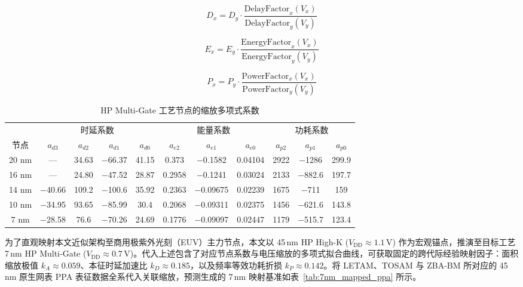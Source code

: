 \documentclass[12pt,a4paper,UTF8]{article}
\begin{document}
\begin{equation}
D_x = D_y \cdot \frac{\mathrm{DelayFactor}_x(V_x)}{\mathrm{DelayFactor}_y(V_y)}
\label{eq:delay_scale}
\end{equation}

\begin{equation}
E_x = E_y \cdot \frac{\mathrm{EnergyFactor}_x(V_x)}{\mathrm{EnergyFactor}_y(V_y)}
\label{eq:energy_scale}
\end{equation}

\begin{equation}
P_x = P_y \cdot \frac{\mathrm{PowerFactor}_x(V_x)}{\mathrm{PowerFactor}_y(V_y)}
\label{eq:power_scale}
\end{equation}

\begin{table}[H]
\footnotesize
\centering
\caption{HP Multi-Gate 工艺节点的缩放多项式系数\cite{stillmaker2017scaling}}
\label{tab:scaling_coeffs}
\begin{tabular}{c|cccc|ccc|ccc}
\toprule
 & \multicolumn{4}{c|}{时延系数} & \multicolumn{3}{c|}{能量系数} & \multicolumn{3}{c}{功耗系数} \\
节点 & \(a_{d3}\) & \(a_{d2}\) & \(a_{d1}\) & \(a_{d0}\) & \(a_{e2}\) & \(a_{e1}\) & \(a_{e0}\) & \(a_{p2}\) & \(a_{p1}\) & \(a_{p0}\) \\
\midrule
20 nm & --- & 34.63 & $-$66.37 & 41.15 & 0.373 & $-$0.1582 & 0.04104 & 2922 & $-$1286 & 299.9 \\
16 nm & --- & 24.80 & $-$47.52 & 28.87 & 0.2958 & $-$0.1241 & 0.03024 & 2133 & $-$882.6 & 197.7 \\
14 nm & $-$40.66 & 109.2 & $-$100.6 & 35.92 & 0.2363 & $-$0.09675 & 0.02239 & 1675 & $-$711 & 159 \\
10 nm & $-$34.95 & 93.65 & $-$85.99 & 30.4 & 0.2068 & $-$0.09311 & 0.02375 & 1456 & $-$621.6 & 143.8 \\
7 nm & $-$28.58 & 76.6 & $-$70.26 & 24.69 & 0.1776 & $-$0.09097 & 0.02447 & 1179 & $-$515.7 & 123.4 \\
\bottomrule
\end{tabular}
\end{table}

为了直观映射本文近似架构至商用极紫外光刻（EUV）主力节点，本文以 45\,nm HP High-K ($V_{\mathrm{DD}}{\approx}1.1\,\text{V}$) 作为宏观锚点，推演至目标工艺 7\,nm HP Multi-Gate ($V_{\mathrm{DD}}{\approx}0.7\,\text{V}$)。代入上述包含了对应节点系数与电压缩放的多项式拟合曲线，可获取固定的跨代际经验映射因子：面积缩放极值 $k_A \approx 0.059$、本征时延加速比 $k_D \approx 0.185$，以及频率等效功耗折损 $k_P \approx 0.142$。将 LETAM、TOSAM 与 ZBA-BM 所对应的 45\,nm 原生网表 PPA 表征数据全系代入关联缩放，预测生成的 7\,nm 映射基准如表~\ref{tab:7nm_mapped_ppa} 所示。
\end{document}
